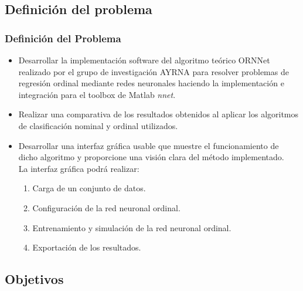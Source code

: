 \documentclass[compress,allowframebreaks]{beamer}
\begin{document}
		\subsection{Definición del problema}

			\begin{frame}
				\frametitle{\normalsize Definición del Problema}

				\begin{itemize}\justifying
					\item Desarrollar la implementación software del algoritmo teórico ORNNet realizado por el grupo de investigación AYRNA para resolver problemas de regresión ordinal mediante redes neuronales haciendo la implementación e integración para el toolbox de Matlab \textit{nnet}.
					\item Realizar una comparativa de los resultados obtenidos al aplicar los algoritmos de clasificación nominal y ordinal utilizados.
					\item Desarrollar una interfaz gráfica usable que muestre el funciona\-miento de dicho algoritmo y proporcione una visión clara del método implementado.\\ La interfaz gráfica podrá realizar:\\
					\begin{enumerate}\justifying
						\item Carga de un conjunto de datos.
						\item Configuración de la red neuronal ordinal.
						\item Entrenamiento y simulación de la red neuronal ordinal.
						\item Exportación de los resultados.
					\end{enumerate}
				\end{itemize}
			\end{frame}

		\subsection{Objetivos}
\end{document}
